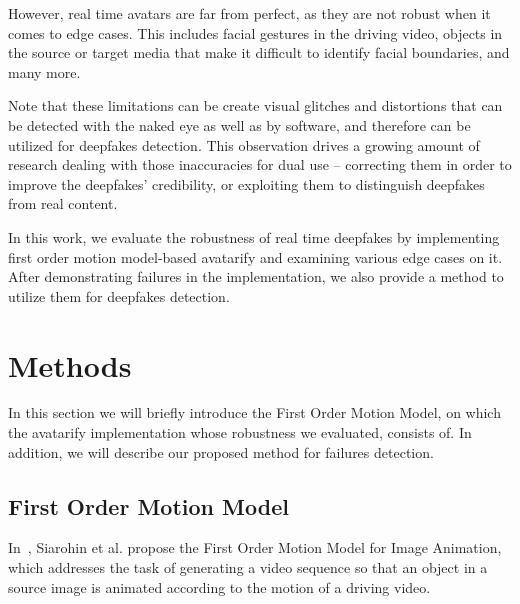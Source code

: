 \documentclass[english,12pt]{article}
\begin{document}
However, real time avatars are far from perfect, as they are not robust when it comes to edge cases.
This includes facial gestures in the driving video, objects in the source or target media that make it
difficult to identify facial boundaries, and many more.


Note that these limitations can be create visual glitches and distortions that can be detected with the
naked eye as well as by software, and therefore can be utilized for deepfakes detection. This observation
drives a growing amount of research dealing with those inaccuracies for dual use -- correcting them in
order to improve the deepfakes' credibility, or exploiting them to distinguish deepfakes from real content.

In this work, we evaluate the robustness of real time deepfakes by implementing first order motion
model-based avatarify and examining various edge cases on it. After demonstrating failures in the
implementation, we also provide a method to utilize them for deepfakes detection.



\section{Methods} \label{methods}

In this section we will briefly introduce the First Order Motion Model, on which the avatarify implementation
whose robustness we evaluated, consists of. In addition, we will describe our proposed method for failures detection.

\subsection{First Order Motion Model}

In~\cite{DBLP:journals/corr/abs-2003-00196}, Siarohin et al. propose the First Order Motion Model for Image
Animation, which addresses the task of generating a video sequence so that an object in a source image
is animated according to the motion of a driving video.
\end{document}
